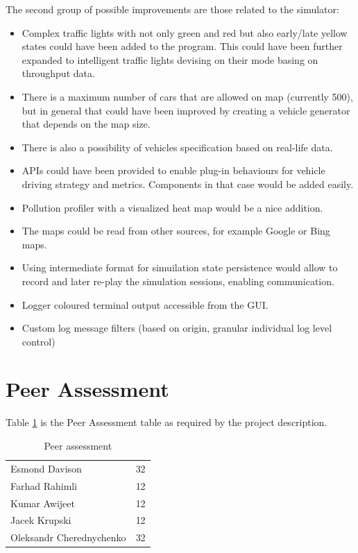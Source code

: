 The second group of possible improvements are those related to the simulator:

\begin{itemize}
	\item Complex traffic lights with not only green and red but also early/late yellow states could have been added to the program. This could have been further expanded to intelligent traffic lights devising on their mode basing on throughput data.
	\item There is a maximum number of cars that are allowed on map (currently 500), but in general that could have been improved by creating a vehicle generator that depends on the map size.
	\item There is also a possibility of vehicles specification based on real-life data.
	\item APIs could have been provided to enable plug-in behaviours for vehicle driving strategy and metrics. Components in that case would be added easily.
	\item Pollution profiler with a visualized heat map would be a nice addition.
    \item The maps could be read from other sources, for example Google or Bing maps.
    \item Using intermediate format for simuilation state persistence would allow to record and later re-play the simulation sessions, enabling communication.
	\item Logger coloured terminal output accessible from the GUI.
	\item Custom log message filters (based on origin, granular individual log level control)
\end{itemize}

\section{Peer Assessment}
Table \ref{table:peerAssesment} is the Peer Assessment table as required by the project description.

\begin{table}[hb]
\centering
\caption{Peer assessment}
\label{table:peerAssesment}
\begin{tabular}{lc}
\hline
Esmond Davison & 32\\
Farhad Rahimli & 12\\
Kumar Awijeet &  12\\
Jacek Krupski &  12\\
Oleksandr Cherednychenko &  32\\
\hline
\end{tabular}
\end{table}

\setlength{\parskip}{0em}
